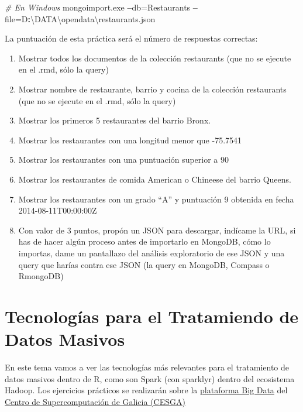 \documentclass[]{book}
\newenvironment{Shaded}{\begin{snugshade}}{\end{snugshade}}
\newcommand{\CommentTok}[1]{\textcolor[rgb]{0.56,0.35,0.01}{\textit{#1}}}
\newcommand{\NormalTok}[1]{#1}
\newcommand{\OperatorTok}[1]{\textcolor[rgb]{0.81,0.36,0.00}{\textbf{#1}}}
\begin{document}
\begin{Shaded}
\begin{Highlighting}[]
\CommentTok{# En Windows}
\NormalTok{mongoimport.exe }\OperatorTok{--}\NormalTok{db=Restaurants }\OperatorTok{--}\NormalTok{file=D}\OperatorTok{:}\NormalTok{\textbackslash{}DATA\textbackslash{}opendata\textbackslash{}restaurants.json}
\end{Highlighting}
\end{Shaded}

La puntuación de esta práctica será el número de respuestas correctas:

\begin{enumerate}
\def\labelenumi{\arabic{enumi}.}
\item
  Mostrar todos los documentos de la colección restaurants (que no se ejecute en el .rmd, sólo la query)
\item
  Mostrar nombre de restaurante, barrio y cocina de la colección restaurants (que no se ejecute en el .rmd, sólo la query)
\item
  Mostrar los primeros 5 restaurantes del barrio Bronx.
\item
  Mostrar los restaurantes con una longitud menor que -75.7541
\item
  Mostrar los restaurantes con una puntuación superior a 90
\item
  Mostrar los restaurantes de comida American o Chineese del barrio Queens.
\item
  Mostrar los restaurantes con un grado ``A'' y puntuación 9 obtenida en fecha 2014-08-11T00:00:00Z
\item
  Con valor de 3 puntos, propón un JSON para descargar, indícame la URL, si has de hacer algún proceso antes de importarlo en MongoDB, cómo lo importas, dame un pantallazo del análisis exploratorio de ese JSON y una query que harías contra ese JSON (la query en MongoDB, Compass o RmongoDB)
\end{enumerate}

\hypertarget{tecnologias-para-el-tratamiendo-de-datos-masivos}{%
\chapter{Tecnologías para el Tratamiendo de Datos Masivos}\label{tecnologias-para-el-tratamiendo-de-datos-masivos}}

En este tema vamos a ver las tecnologías más relevantes para el tratamiento de datos masivos dentro de R, como son Spark (con sparklyr) dentro del ecosistema Hadoop. Los ejercicios prácticos se realizarán sobre la \href{http://bigdata.cesga.es/}{plataforma Big Data} del \href{http://www.cesga.es}{Centro de Supercomputación de Galicia (CESGA)}
\end{document}

